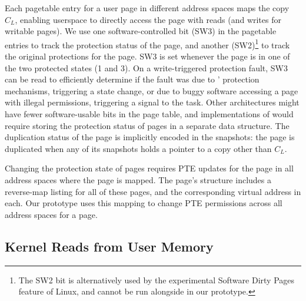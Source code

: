 \documentclass[letterpaper,twocolumn,10pt]{article}
\begin{document}
Each pagetable entry for a user page in different address spaces 
maps the copy $C_L$, enabling userspace to directly access the page
with reads (and writes for writable pages).
We use one software-controlled bit (SW3) in the pagetable entries 
to track the protection status of the page, and another 
(SW2)\footnote{The SW2 bit is alternatively used by the experimental Software Dirty Pages feature of 
Linux, and cannot be run alongside \midas in our prototype.}
to track the original protections for the page. 
SW3 is set whenever the page is in one of the two protected
states (1 and 3).
On a write-triggered protection fault, SW3 can be read to 
efficiently determine if the fault was due to \midas' protection 
mechanisms, triggering a state change, or due to buggy software
accessing a page with illegal permissions, triggering a signal to 
the task.
Other architectures might have fewer software-usable 
bits in the page table, and implementations of \midas would 
require storing the protection status of pages in a separate data structure.
The duplication status of the page is implicitly encoded in the 
snapshots: the page is duplicated when any of its snapshots
holds a pointer to a copy other than $C_L$.

Changing the protection state of pages requires PTE updates
for the page in all address spaces where the page is mapped.
The page's  structure includes a reverse-map
listing for all of these pages, and the corresponding virtual
address in each.
Our prototype uses this mapping to change PTE permissions across
all address spaces for a page.


\subsection{Kernel Reads from User Memory}
\end{document}

